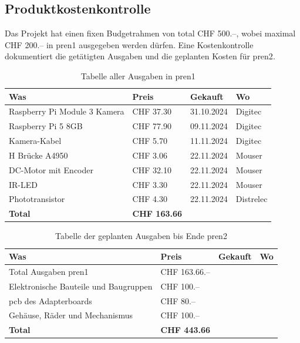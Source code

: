 \documentclass[../main.tex]{subfiles}
\begin{document}
\subsection{Produktkostenkontrolle}
Das Projekt hat einen fixen Budgetrahmen von total CHF 500.--, wobei maximal CHF 200.-- in \acrshort{pren1} ausgegeben werden dürfen. Eine Kostenkontrolle dokumentiert die getätigten Ausgaben und die geplanten Kosten für \acrshort{pren2}.
\begin{table}[H]
\begin{tabular}{|p{6cm}|p{2.5cm}|p{2cm}|p{2.5cm}|}
\hline
\textbf{Was} & \textbf{Preis} & \textbf{Gekauft} & \textbf{Wo} \\ \hline
Raspberry Pi Module 3 Kamera & CHF 37.30 & 31.10.2024 & Digitec \\ \hline
Raspberry Pi 5 8GB & CHF 77.90 & 09.11.2024 & Digitec \\ \hline
Kamera-Kabel & CHF 5.70 & 11.11.2024 & Digitec \\ \hline
H Brücke A4950 & CHF 3.06 & 22.11.2024 & Mouser \\ \hline
DC-Motor mit Encoder & CHF 32.10 & 22.11.2024 & Mouser \\ \hline
IR-LED & CHF 3.30 & 22.11.2024 & Mouser \\ \hline
Phototransistor & CHF 4.30 & 22.11.2024 & Distrelec \\ \hline
\hline
\textbf{Total} & \textbf{CHF 163.66} & & \\ \hline
\end{tabular}
\caption{Tabelle aller Ausgaben in \acrshort{pren1}}
\label{tab:ausgaben_pren1}
\end{table}

\begin{table}[H]
\begin{tabular}{|p{6cm}|p{2.5cm}|p{2cm}|p{2.5cm}|}
\hline
\textbf{Was} & \textbf{Preis} & \textbf{Gekauft} & \textbf{Wo} \\ \hline
Total Ausgaben \acrshort{pren1} & CHF 163.66.-- &  &  \\ \hline
Elektronische Bauteile und Baugruppen & CHF 100.-- &  &  \\ \hline
\acrshort{pcb} des Adapterboards & CHF 80.-- &  &  \\ \hline
Gehäuse, Räder und Mechanismus & CHF 100.-- &  &  \\ \hline
\hline
\textbf{Total} & \textbf{CHF 443.66} & & \\ \hline
\end{tabular}
\caption{Tabelle der geplanten Ausgaben bis Ende \acrshort{pren2}}
\label{tab:ausgaben_pren2}
\end{table}
\end{document}
